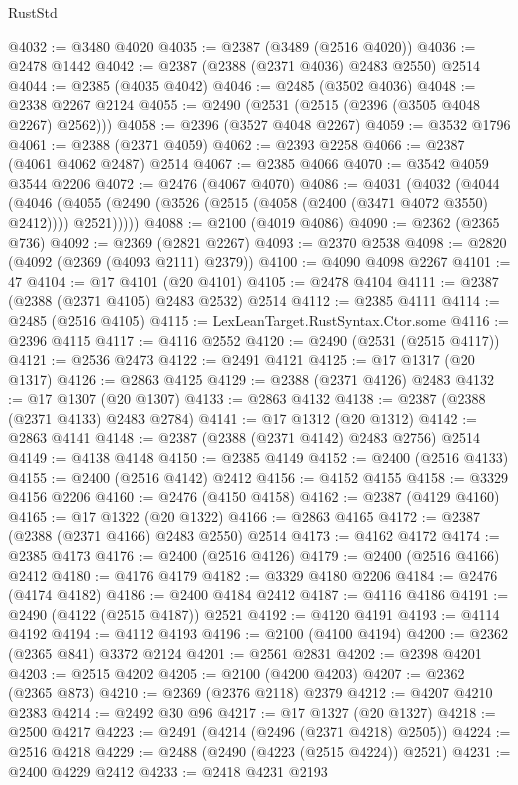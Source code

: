 \begin{lexlean}{RustStd}
\begin{coremodule}
@4032 := @3480 @4020
@4035 := @2387 (@3489 (@2516 @4020))
@4036 := @2478 @1442
@4042 := @2387 (@2388 (@2371 @4036) @2483 @2550) @2514
@4044 := @2385 (@4035 @4042)
@4046 := @2485 (@3502 @4036)
@4048 := @2338 @2267 @2124
@4055 := @2490 (@2531 (@2515 (@2396 (@3505 @4048 @2267) @2562)))
@4058 := @2396 (@3527 @4048 @2267)
@4059 := @3532 @1796
@4061 := @2388 (@2371 @4059)
@4062 := @2393 @2258
@4066 := @2387 (@4061 @4062 @2487) @2514
@4067 := @2385 @4066
@4070 := @3542 @4059 @3544 @2206
@4072 := @2476 (@4067 @4070)
@4086 := @4031
    (@4032
      (@4044
        (@4046 (@4055 (@2490 (@3526 (@2515 (@4058 (@2400 (@3471 @4072 @3550) @2412)))) @2521)))))
@4088 := @2100 (@4019 @4086)
@4090 := @2362 (@2365 @736)
@4092 := @2369 (@2821 @2267)
@4093 := @2370 @2538
@4098 := @2820 (@4092 (@2369 (@4093 @2111) @2379))
@4100 := @4090 @4098 @2267
@4101 := 47
@4104 := @17 @4101 (@20 @4101)
@4105 := @2478 @4104
@4111 := @2387 (@2388 (@2371 @4105) @2483 @2532) @2514
@4112 := @2385 @4111
@4114 := @2485 (@2516 @4105)
@4115 := LexLeanTarget.RustSyntax.Ctor.some
@4116 := @2396 @4115
@4117 := @4116 @2552
@4120 := @2490 (@2531 (@2515 @4117))
@4121 := @2536 @2473
@4122 := @2491 @4121
@4125 := @17 @1317 (@20 @1317)
@4126 := @2863 @4125
@4129 := @2388 (@2371 @4126) @2483
@4132 := @17 @1307 (@20 @1307)
@4133 := @2863 @4132
@4138 := @2387 (@2388 (@2371 @4133) @2483 @2784)
@4141 := @17 @1312 (@20 @1312)
@4142 := @2863 @4141
@4148 := @2387 (@2388 (@2371 @4142) @2483 @2756) @2514
@4149 := @4138 @4148
@4150 := @2385 @4149
@4152 := @2400 (@2516 @4133)
@4155 := @2400 (@2516 @4142) @2412
@4156 := @4152 @4155
@4158 := @3329 @4156 @2206
@4160 := @2476 (@4150 @4158)
@4162 := @2387 (@4129 @4160)
@4165 := @17 @1322 (@20 @1322)
@4166 := @2863 @4165
@4172 := @2387 (@2388 (@2371 @4166) @2483 @2550) @2514
@4173 := @4162 @4172
@4174 := @2385 @4173
@4176 := @2400 (@2516 @4126)
@4179 := @2400 (@2516 @4166) @2412
@4180 := @4176 @4179
@4182 := @3329 @4180 @2206
@4184 := @2476 (@4174 @4182)
@4186 := @2400 @4184 @2412
@4187 := @4116 @4186
@4191 := @2490 (@4122 (@2515 @4187)) @2521
@4192 := @4120 @4191
@4193 := @4114 @4192
@4194 := @4112 @4193
@4196 := @2100 (@4100 @4194)
@4200 := @2362 (@2365 @841) @3372 @2124
@4201 := @2561 @2831
@4202 := @2398 @4201
@4203 := @2515 @4202
@4205 := @2100 (@4200 @4203)
@4207 := @2362 (@2365 @873)
@4210 := @2369 (@2376 @2118) @2379
@4212 := @4207 @4210 @2383
@4214 := @2492 @30 @96
@4217 := @17 @1327 (@20 @1327)
@4218 := @2500 @4217
@4223 := @2491 (@4214 (@2496 (@2371 @4218) @2505))
@4224 := @2516 @4218
@4229 := @2488 (@2490 (@4223 (@2515 @4224)) @2521)
@4231 := @2400 @4229 @2412
@4233 := @2418 @4231 @2193

\end{coremodule}
\end{lexlean}
